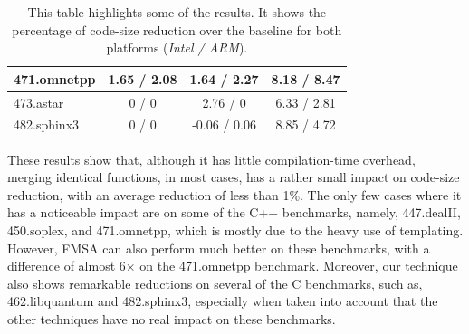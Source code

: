 \begin{table}[]
{\begin{tabular}{|l|c|c|c|}
471.omnetpp                               & 1.65 / 2.08        & 1.64 / 2.27   & 8.18 / 8.47             \\ \hline
473.astar                                 & 0 / 0              & 2.76 / 0      & 6.33 / 2.81             \\ \hline
482.sphinx3                               & 0 / 0              & -0.06 / 0.06  & 8.85 / 4.72             \\ \hline
\end{tabular}
}
\caption{This table highlights some of the results.
         It shows the percentage of code-size reduction over the baseline
         for both platforms (\textit{Intel / ARM}). }
\end{table}

These results show that, although it has little compilation-time overhead,
merging identical functions, in most cases, has a rather small impact on
code-size reduction, with an average reduction of less than 1\%.
The only few cases where it has a noticeable impact are on some of the C++
benchmarks, namely, 447.dealII, 450.soplex, and 471.omnetpp, which is mostly
due to the heavy use of templating. %
However, FMSA can also perform much better on these
benchmarks, with a difference of almost 6$\times$ on the 471.omnetpp benchmark.
Moreover, our technique also shows remarkable reductions on several of the
C benchmarks, such as, 462.libquantum and 482.sphinx3, especially when taken into
account that the other techniques have no real impact on these benchmarks.



